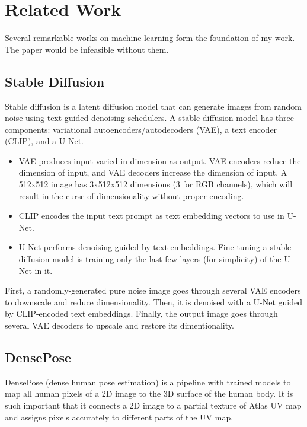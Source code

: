 \documentclass[acmtog]{acmart}
\begin{document}
\section{Related Work}

Several remarkable works on machine learning form the foundation of my work. The paper would be infeasible without them.

\subsection{Stable Diffusion}

Stable diffusion is a latent diffusion model that can generate images from random noise using text-guided denoising schedulers. A stable diffusion model has three components: variational autoencoders/autodecoders (VAE), a text encoder (CLIP), and a U-Net.

\begin{itemize}
  \item VAE produces input varied in dimension as output. VAE encoders reduce the dimension of input, and VAE decoders increase the dimension of input. A 512x512 image has 3x512x512 dimensions (3 for RGB channels), which will result in the curse of dimensionality without proper encoding.
  \item CLIP encodes the input text prompt as text embedding vectors to use in U-Net.
  \item U-Net performs denoising guided by text embeddings. Fine-tuning a stable diffusion model is training only the last few layers (for simplicity) of the U-Net in it.
\end{itemize}

First, a randomly-generated pure noise image goes through several VAE encoders to downscale and reduce dimensionality. Then, it is denoised with a U-Net guided by CLIP-encoded text embeddings. Finally, the output image goes through several VAE decoders to upscale and restore its dimentionality.

\subsection{DensePose}

DensePose (dense human pose estimation) \cite{guler2018densepose} is a pipeline with trained models to map all human pixels of a 2D image to the 3D surface of the human body. It is such important that it connects a 2D image to a partial texture of Atlas UV map and assigns pixels accurately to different parts of the UV map.
\end{document}
